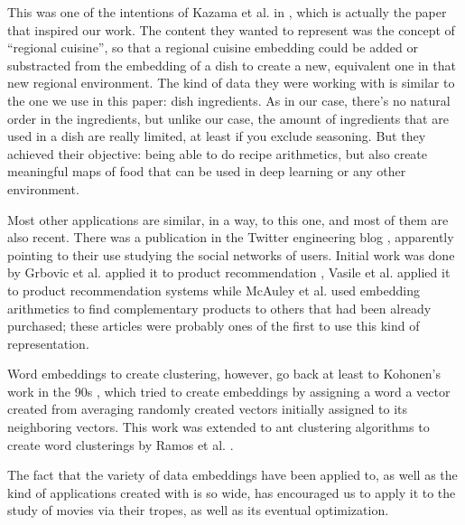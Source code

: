\documentclass[letterpaper]{article}
\begin{document}
        This was one of the intentions of Kazama et al. in
        \cite{kazama2018}, which is actually the paper that inspired
        our work. The content they wanted to represent was the concept
        of ``regional cuisine'', so that a regional cuisine embedding
        could be added or substracted from the embedding of a dish to
        create a new, equivalent one in that new regional
        environment. The kind of data they were working with is
        similar to the one we use in this paper: dish ingredients. As
        in our case, there's no natural order in the ingredients, but
        unlike our case, the amount of ingredients that are used in a
        dish are really limited, at least if you exclude
        seasoning. But they achieved their objective: being able to do
        recipe arithmetics, but also create meaningful maps of food
        that can be used in deep learning or any other environment.

        Most other applications are similar, in a way, to this one,
        and most of them are also recent. There was a publication in
        the Twitter engineering blog \cite{twitter:embeddings},
        apparently pointing to their use studying the social networks
        of users. Initial work was done by Grbovic et al. applied it to product recommendation
        \cite{Grbovic2015}, Vasile et al. applied it to product
        recommendation systems \cite{vasile2016} while McAuley et
        al. \cite{DBLP:journals/corr/McAuleyPL15} used embedding
        arithmetics to find complementary products to others that had
        been already purchased; these articles were
        probably ones of the first to use this kind of
        representation.

        Word embeddings to create clustering, however, go back at
        least to Kohonen's work in the 90s
        \cite{kohonen1997exploration}, which tried to create
        embeddings by assigning a word a vector created from averaging
        randomly created vectors initially assigned to its neighboring
        vectors. This work was extended to ant clustering algorithms
        to create word clusterings by Ramos et
        al. \cite{DBLP:journals/corr/abs-cs-0412075}.

        The fact that the variety of data embeddings have been applied
        to, as well as the kind of applications created with is so
        wide, has encouraged us to apply it to the study of movies via
        their tropes, as well as its eventual optimization.
\end{document}
